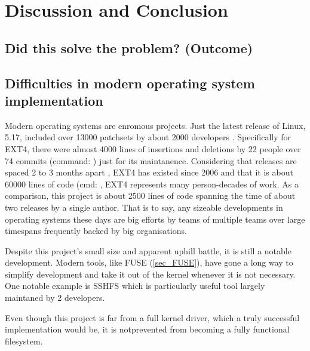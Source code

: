 \chapter{Discussion and Conclusion}

    \section{Did this solve the problem? (Outcome)}

    \section{Difficulties in modern operating system implementation}

        Modern operating systems are enromous projects. Just the latest release
        of Linux, 5.17, included over 13000 patchsets by about 2000 developers
        \cite{http://www.remword.com/kps_result/5.17_whole.html}.  Specifically
        for EXT4, there were almost 4000 lines of insertions and deletions by
        22 people over 74 commits (command: ) just for its maintanence. Considering that
        releases are spaced 2 to 3 months apart
        \cite{https://www.kernel.org/doc/html/latest/process/2.Process.html},
        EXT4 has existed since 2006 and that it is about 60000 lines of code
        (cmd: , EXT4 represents many person-decades of
        work. As a comparison, this project is about 2500 lines of code
        spanning the time of about two releases by a single author. That is to
        say, any sizeable developments in operating systems these days are big
        efforts by teams of multiple teams over large timespans frequently
        backed by big organisations.

        Despite this project's small size and apparent uphill battle, it is
        still a notable development. Modern tools, like FUSE (\ref{sec_FUSE}),
        have gone a long way to simplify development and take it out of the
        kernel whenever it is not necessary. One notable example is SSHFS
        \cite{https://github.com/libfuse/sshfs} which is particularly useful
        tool largely maintaned by 2 developers.

        Even though this project is far from a full kernel driver, which a
        truly successful implementation would be, it is notprevented from
        becoming a fully functional filesystem.

